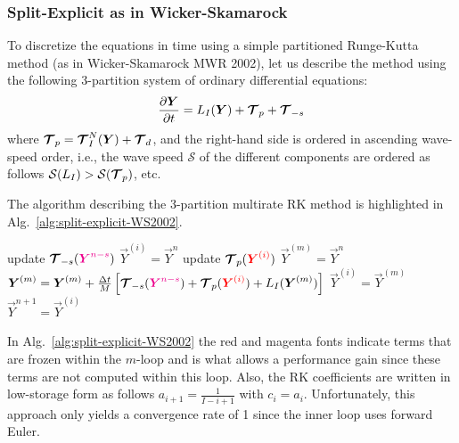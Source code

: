 \documentclass{report}
\begin{document}
\subsubsection{Split-Explicit as in Wicker-Skamarock}
To discretize the equations in time using a simple partitioned Runge-Kutta method (as in Wicker-Skamarock MWR 2002), let us describe the method using the following 3-partition system of ordinary differential equations:
\[
\frac{\partial \boldsymbol{{Y}}}{\partial t}= L_I(\boldsymbol{{Y}}) + \boldsymbol{{\mathcal{T}}}_{p} + \boldsymbol{{\mathcal{T}}}_{-s}
\]
where $\boldsymbol{{\mathcal{T}}}_{p}=\boldsymbol{{\mathcal{T}}}^N_{I}(\boldsymbol{{Y}}) + \boldsymbol{{\mathcal{T}}}_{d}$, and the right-hand side is ordered in ascending wave-speed order, i.e., 
the wave speed $\mathcal{S}$ of the different components are ordered as follows $\mathcal{S}(L_I) > \mathcal{S}(\boldsymbol{{\mathcal{T}}}_{p})$, etc.

The algorithm describing the 3-partition multirate RK method is highlighted in Alg.\ \ref{alg:split-explicit-WS2002}.
\begin{algorithm}
\label{alg:split-explicit-WS2002}
\begin{algorithmic}
\State
{}
\State update $\boldsymbol{{\mathcal{T}}}_{-s}(\textcolor{magenta}{ \boldsymbol{{Y}}^{n-s}})$
\State $\vec{Y}^{(i)}=\vec{Y}^n$ 
\State update $\boldsymbol{{\mathcal{T}}}_{p}(\textcolor{red}{ \boldsymbol{{Y}}^{(i)} })$
\State $\vec{Y}^{(m)}=\vec{Y}^{n}$ 
\State $\boldsymbol{{Y}}^{(m)}=\boldsymbol{{Y}}^{(m)} + \frac{\Delta t}{M} \left[ \boldsymbol{{\mathcal{T}}}_{-s}(\textcolor{magenta}{ \boldsymbol{{Y}}^{n-s} }) + \boldsymbol{{\mathcal{T}}}_{p}(\textcolor{red}{ \boldsymbol{{Y}}^{(i)}}) + L_I(\boldsymbol{{Y}}^{(m)}) \right]$
\EndFor %
\State $\vec{Y}^{(i)}=\vec{Y}^{(m)}$
\EndFor %
\State $\vec{Y}^{n+1}=\vec{Y}^{(i)}$
\EndFunction
\end{algorithmic}
\end{algorithm}
In Alg.\ \ref{alg:split-explicit-WS2002} the red and magenta fonts indicate terms that are frozen within the $m$-loop and is what allows a performance gain since these terms are not computed within this loop. Also, 
the RK coefficients are written in low-storage form as follows $a_{i+1}=\frac{1}{I-i+1}$ with $c_i=a_i$. Unfortunately, this approach only yields a convergence rate of 1 since the inner loop uses forward Euler.
\end{document}
